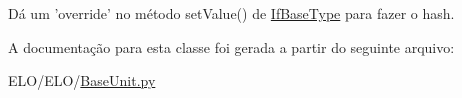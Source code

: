 Dá um 'override' no método set\-Value() de \hyperlink{classELO_1_1BaseUnit_1_1IfBaseType}{If\-Base\-Type} para fazer o hash. 



A documentação para esta classe foi gerada a partir do seguinte arquivo\-:\begin{DoxyCompactItemize}
\item 
E\-L\-O/\-E\-L\-O/\hyperlink{BaseUnit_8py}{Base\-Unit.\-py}\end{DoxyCompactItemize}
